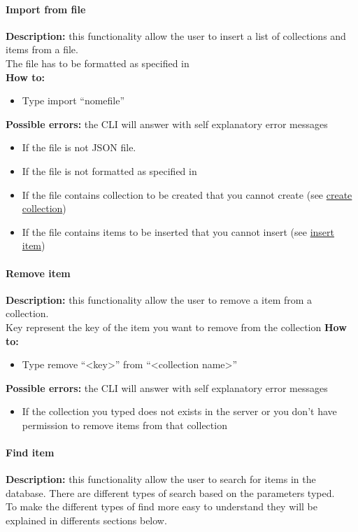 \documentclass{scalatekids-article}
\begin{document}
\paragraph{Import from file}
\label{sec:import}
\textbf{Description:} this functionality allow the user to insert a list of collections and items from a file.\\
The file has to be formatted as specified in \\%
\textbf{How to:} 
\begin{itemize}
	\item Type import ``nomefile''
\end{itemize}
\textbf{Possible errors:} the CLI will answer with self explanatory error messages 
\begin{itemize}
	\item If the file is not JSON file.
	\item If the file is not formatted as specified in %
	\item If the file contains collection to be created that you cannot create (see \hyperref[sec:createcollection]{create collection})
	\item If the file contains items to be inserted that you cannot insert (see \hyperref[sec:insertitem]{insert item}) 
\end{itemize}

\paragraph{Remove item}
\label{sec:removeitem}
\textbf{Description:} this functionality allow the user to remove a item from a collection.\\
Key represent the key of the item you want to remove from the collection
\textbf{How to:} 
\begin{itemize}
	\item Type remove ``<key>'' from ``<collection name>''
\end{itemize}
\textbf{Possible errors:} the CLI will answer with self explanatory error messages 
\begin{itemize}
	\item If the collection you typed does not exists in the server or you don't have permission to remove items from that collection
\end{itemize}

\paragraph{Find item}
\label{sec:find}
\textbf{Description:} this functionality allow the user to search for items in the database. There are different types of search based on the parameters typed.\\
To make the different types of find more easy to understand they will be 
explained in differents sections below.
\end{document}
